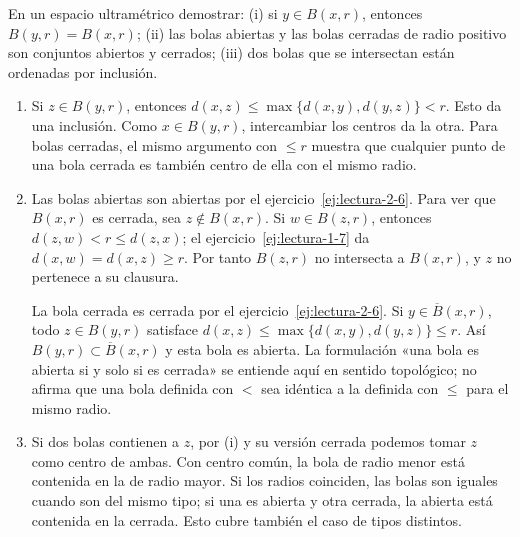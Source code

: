 \begin{ejercicio}\label{ej:lectura-2-5}
En un espacio ultramétrico demostrar: (i) si $y\in B(x,r)$, entonces $B(y,r)=B(x,r)$; (ii) las bolas abiertas y las bolas cerradas de radio positivo son conjuntos abiertos y cerrados; (iii) dos bolas que se intersectan están ordenadas por inclusión.
\end{ejercicio}
\begin{solucion}
\begin{enumerate}[label=(\roman*)]
\item Si $z\in B(y,r)$, entonces $d(x,z)\le\max\{d(x,y),d(y,z)\}<r$. Esto da una inclusión. Como $x\in B(y,r)$, intercambiar los centros da la otra. Para bolas cerradas, el mismo argumento con $\le r$ muestra que cualquier punto de una bola cerrada es también centro de ella con el mismo radio.
\item Las bolas abiertas son abiertas por el ejercicio~\ref{ej:lectura-2-6}. Para ver que $B(x,r)$ es cerrada, sea $z\notin B(x,r)$. Si $w\in B(z,r)$, entonces $d(z,w)<r\le d(z,x)$; el ejercicio~\ref{ej:lectura-1-7} da $d(x,w)=d(x,z)\ge r$. Por tanto $B(z,r)$ no intersecta a $B(x,r)$, y $z$ no pertenece a su clausura.

La bola cerrada es cerrada por el ejercicio~\ref{ej:lectura-2-6}. Si $y\in\overline B(x,r)$, todo $z\in B(y,r)$ satisface $d(x,z)\le\max\{d(x,y),d(y,z)\}\le r$. Así $B(y,r)\subset\overline B(x,r)$ y esta bola es abierta. La formulación «una bola es abierta si y solo si es cerrada» se entiende aquí en sentido topológico; no afirma que una bola definida con $<$ sea idéntica a la definida con $\le$ para el mismo radio.
\item Si dos bolas contienen a $z$, por (i) y su versión cerrada podemos tomar $z$ como centro de ambas. Con centro común, la bola de radio menor está contenida en la de radio mayor. Si los radios coinciden, las bolas son iguales cuando son del mismo tipo; si una es abierta y otra cerrada, la abierta está contenida en la cerrada. Esto cubre también el caso de tipos distintos.
\end{enumerate}
\end{solucion}

